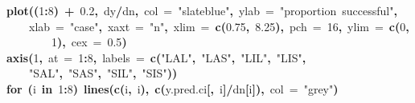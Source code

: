 \documentclass{article}
\makeatletter
\newcommand{\hlnumber}[1]{\textcolor[rgb]{0,0,0}{#1}}%
\newcommand{\hlfunctioncall}[1]{\textcolor[rgb]{.5,0,.33}{\textbf{#1}}}%
\newcommand{\hlstring}[1]{\textcolor[rgb]{.6,.6,1}{#1}}%
\newcommand{\hlkeyword}[1]{\textbf{#1}}%
\newcommand{\hlargument}[1]{\textcolor[rgb]{.69,.25,.02}{#1}}%
\newcommand{\hlsymbol}[1]{#1}%
\newcommand{\hlstd}[1]{\textcolor[rgb]{0,0,0}{#1}}%
\newenvironment{kframe}{%
 \def\FrameCommand##1{\hskip\@totalleftmargin \hskip-\fboxsep
 \colorbox{shadecolor}{##1}\hskip-\fboxsep
     \hskip-\linewidth \hskip-\@totalleftmargin \hskip\columnwidth}%
 \MakeFramed {\advance\hsize-\width
   \@totalleftmargin\z@ \linewidth\hsize
   \@setminipage}}%
 {\par\unskip\endMakeFramed}
\newenvironment{knitrout}{}{} %
\makeatother
\begin{document}
\begin{knitrout}
{\begin{kframe}
\begin{flushleft}
\hlstd{}\hlfunctioncall{plot}\hlkeyword{(}\hlkeyword{(}\hlnumber{1}\hlkeyword{:}\hlnumber{8}\hlkeyword{)}{\ }\hlkeyword{+}{\ }\hlnumber{0.2}\hlkeyword{,}{\ }\hlsymbol{d}\hlkeyword{\usebox{\hlnormalsizeboxdollar}}\hlsymbol{y}\hlkeyword{/}\hlsymbol{d}\hlkeyword{\usebox{\hlnormalsizeboxdollar}}\hlsymbol{n}\hlkeyword{,}{\ }\hlargument{col}{\ }\hlargument{=}{\ }\hlstring{"slateblue"}\hlkeyword{,}{\ }\hlargument{ylab}{\ }\hlargument{=}{\ }\hlstring{"proportion{\ }successful"}\hlkeyword{,}\hspace*{\fill}\\
\hlstd{}{\ }{\ }{\ }{\ }\hlargument{xlab}{\ }\hlargument{=}{\ }\hlstring{"case"}\hlkeyword{,}{\ }\hlargument{xaxt}{\ }\hlargument{=}{\ }\hlstring{"n"}\hlkeyword{,}{\ }\hlargument{xlim}{\ }\hlargument{=}{\ }\hlfunctioncall{c}\hlkeyword{(}\hlnumber{0.75}\hlkeyword{,}{\ }\hlnumber{8.25}\hlkeyword{)}\hlkeyword{,}{\ }\hlargument{pch}{\ }\hlargument{=}{\ }\hlnumber{16}\hlkeyword{,}{\ }\hlargument{ylim}{\ }\hlargument{=}{\ }\hlfunctioncall{c}\hlkeyword{(}\hlnumber{0}\hlkeyword{,}\hspace*{\fill}\\
\hlstd{}{\ }{\ }{\ }{\ }{\ }{\ }{\ }{\ }\hlnumber{1}\hlkeyword{)}\hlkeyword{,}{\ }\hlargument{cex}{\ }\hlargument{=}{\ }\hlnumber{0.5}\hlkeyword{)}\hspace*{\fill}\\
\hlstd{}\hlfunctioncall{axis}\hlkeyword{(}\hlnumber{1}\hlkeyword{,}{\ }\hlargument{at}{\ }\hlargument{=}{\ }\hlnumber{1}\hlkeyword{:}\hlnumber{8}\hlkeyword{,}{\ }\hlargument{labels}{\ }\hlargument{=}{\ }\hlfunctioncall{c}\hlkeyword{(}\hlstring{"LAL"}\hlkeyword{,}{\ }\hlstring{"LAS"}\hlkeyword{,}{\ }\hlstring{"LIL"}\hlkeyword{,}{\ }\hlstring{"LIS"}\hlkeyword{,}\hspace*{\fill}\\
\hlstd{}{\ }{\ }{\ }{\ }\hlstring{"SAL"}\hlkeyword{,}{\ }\hlstring{"SAS"}\hlkeyword{,}{\ }\hlstring{"SIL"}\hlkeyword{,}{\ }\hlstring{"SIS"}\hlkeyword{)}\hlkeyword{)}\hspace*{\fill}\\
\hlstd{}\hlkeyword{for}{\ }\hlkeyword{(}\hlsymbol{i}{\ }\hlkeyword{in}{\ }\hlnumber{1}\hlkeyword{:}\hlnumber{8}\hlkeyword{)}{\ }\hlfunctioncall{lines}\hlkeyword{(}\hlfunctioncall{c}\hlkeyword{(}\hlsymbol{i}\hlkeyword{,}{\ }\hlsymbol{i}\hlkeyword{)}\hlkeyword{,}{\ }\hlfunctioncall{c}\hlkeyword{(}\hlsymbol{y.pred.ci}\hlkeyword{[}\hlkeyword{,}{\ }\hlsymbol{i}\hlkeyword{]}\hlkeyword{/}\hlsymbol{d}\hlkeyword{\usebox{\hlnormalsizeboxdollar}}\hlsymbol{n}\hlkeyword{[}\hlsymbol{i}\hlkeyword{]}\hlkeyword{)}\hlkeyword{,}{\ }\hlargument{col}{\ }\hlargument{=}{\ }\hlstring{"grey"}\hlkeyword{)}\hspace*{\fill}\\

\end{flushleft}
\end{kframe}}
\end{knitrout}
\end{document}
